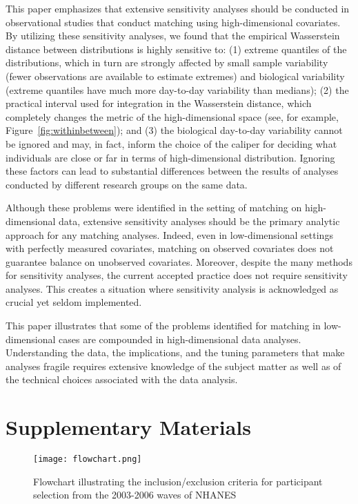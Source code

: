 This paper emphasizes that extensive sensitivity analyses should be conducted in observational studies that conduct matching using high-dimensional covariates. By utilizing these sensitivity analyses, we found that the empirical Wasserstein distance between distributions is highly sensitive to: (1) extreme quantiles of the distributions, which in turn are strongly affected by small sample variability (fewer observations are available to estimate extremes) and biological variability (extreme quantiles have much more day-to-day variability than medians); (2) the practical interval used for integration in the Wasserstein distance, which completely changes the metric of the high-dimensional space (see, for example, Figure~\ref{fig:withinbetween}); and (3) the biological day-to-day variability cannot be ignored and may, in fact, inform the choice of the caliper for deciding what individuals are close or far in terms of high-dimensional distribution. Ignoring these factors can lead to substantial differences between the results of analyses conducted by different research groups on the same data.

Although these problems were identified in the setting of matching on high-dimensional data, extensive sensitivity analyses should be the primary analytic approach for any matching analyses. Indeed, even in low-dimensional settings with perfectly measured covariates, matching on observed covariates does not guarantee balance on unobserved covariates. Moreover, despite the many methods for sensitivity analyses, the current accepted practice does not require sensitivity analyses. This creates a situation where sensitivity analysis is acknowledged as crucial yet seldom implemented. 

This paper illustrates that some of the problems identified for matching in low-dimensional cases are compounded in high-dimensional data analyses. Understanding the data, the implications, and the tuning parameters that make analyses fragile requires extensive knowledge of the subject matter as well as of the technical choices associated with the data analysis. 




\newpage

 








\newpage
\section{Supplementary Materials}


\begin{figure}[H]
    \centering
    \texttt{[image: flowchart.png]}
    \caption{Flowchart illustrating the inclusion/exclusion criteria for participant selection from the 2003-2006 waves of NHANES}
    \label{fig:flowchart}
\end{figure}


